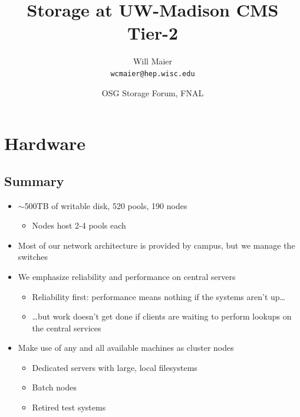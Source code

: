 \documentclass{beamer}
\title{Storage at UW-Madison CMS Tier-2}
\author[Maier]{
    Will Maier \\ 
    {\tt wcmaier@hep.wisc.edu}}
\institute[Wisconsin]{University of Wisconsin - High Energy Physics}
\date[2009.06.30]{OSG Storage Forum, FNAL}
\newcommand{\ca}{\ensuremath{\sim}}
\begin{document}

\begin{frame}
    \titlepage
\end{frame}

\begin{frame}
    \tableofcontents
\end{frame}

\section{Hardware}
\subsection{Summary}
\begin{frame}
\begin{itemize}
	\item \ca{}500TB of writable disk, 520 pools, 190 nodes
	\begin{itemize}
		\item Nodes host 2-4 pools each
	\end{itemize}
	\item Most of our network architecture is provided by campus, but we manage the switches
	\item We emphasize reliability and performance on central servers
	\begin{itemize}
		\item Reliability first: performance means nothing if the systems aren't up\ldots{}
		\item \ldots{}but work doesn't get done if clients are waiting to perform lookups on the central services
	\end{itemize}
	\item Make use of any and all available machines as cluster nodes
	\begin{itemize}
		\item Dedicated servers with large, local filesystems
		\item Batch nodes
		\item Retired test systems
	\end{itemize}
\end{itemize}
\end{frame}
\end{document}
